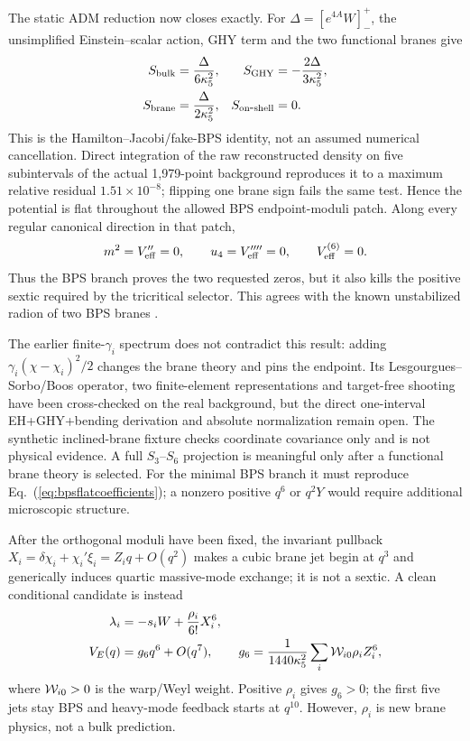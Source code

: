 \documentclass[10pt]{article}
\begin{document}
The static ADM reduction now closes exactly.  For
$\Delta=[e^{4A}W]_-^+$, the unsimplified Einstein--scalar action, GHY term and
the two functional branes give
\begin{equation}
 \begin{aligned}
 S_{\rm bulk}&=\frac{\Delta}{6\kappa_5^2},&
 S_{\rm GHY}&=-\frac{2\Delta}{3\kappa_5^2},\\
 S_{\rm brane}&=\frac{\Delta}{2\kappa_5^2},&
 S_{\rm on\mbox{-}shell}&=0 .
 \end{aligned}
 \label{eq:bpsradioncancellation}
\end{equation}
This is the Hamilton--Jacobi/fake-BPS identity, not an assumed numerical
cancellation.  Direct integration of the raw reconstructed density on five
subintervals of the actual 1,979-point background reproduces it to a maximum
relative residual $1.51\times10^{-8}$; flipping one brane sign fails the same
test.  Hence the potential is flat throughout the allowed BPS endpoint-moduli
patch.  Along every regular canonical direction in that patch,
\begin{equation}
 m^2=V_{\rm eff}''=0,\qquad u_4=V_{\rm eff}''''=0,\qquad
 V_{\rm eff}^{(6)}=0 .
 \label{eq:bpsflatcoefficients}
\end{equation}
Thus the BPS branch proves the two requested zeros, but it also kills the
positive sextic required by the tricritical selector.  This agrees with the
known unstabilized radion of two BPS branes \citep{Cynolter2002}.

The earlier finite-$\gamma_i$ spectrum does not contradict this result: adding
$\gamma_i(\chi-\chi_i)^2/2$ changes the brane theory and pins the endpoint.
Its Lesgourgues--Sorbo/Boos operator, two finite-element representations and
target-free shooting have been cross-checked on the real background, but the
direct one-interval EH+GHY+bending derivation and absolute normalization remain
open.  The synthetic inclined-brane fixture checks coordinate covariance only
and is not physical evidence.  A full $S_3$--$S_6$ projection is meaningful
only after a functional brane theory is selected.  For the minimal BPS branch
it must reproduce Eq.~(\ref{eq:bpsflatcoefficients}); a nonzero positive $q^6$
or $q^2Y$ would require additional microscopic structure.

After the orthogonal moduli have been fixed, the invariant pullback
$X_i=\delta\chi_i+\chi_i'\xi_i=Z_iq+O(q^2)$ makes a cubic brane jet begin at $q^3$
and generically induces quartic massive-mode exchange; it is not a sextic.
A clean conditional candidate is instead
\begin{equation}
 \begin{aligned}
 \lambda_i&=-s_iW+\frac{\rho_i}{6!}X_i^6,\\
 V_E(q)&=g_6q^6+O(q^7),\qquad
 g_6=\frac1{1440\kappa_5^2}\sum_i {\cal W}_{i0}\rho_iZ_i^6,
 \end{aligned}
 \label{eq:localizedsexticdetuning}
\end{equation}
where ${\cal W}_{i0}>0$ is the warp/Weyl weight.  Positive $\rho_i$ gives
$g_6>0$; the first five jets stay BPS and heavy-mode feedback starts at
$q^{10}$.  However, $\rho_i$ is new brane physics, not a bulk prediction.
\end{document}

